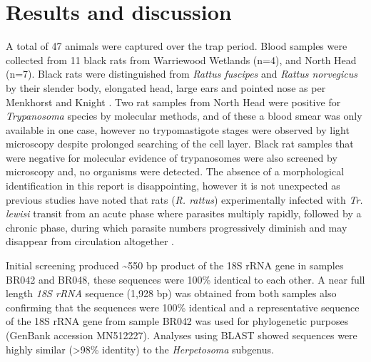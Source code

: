 \documentclass[a4paper, nobind]{templates/ociamthesis}
\begin{document}
\hypertarget{results-and-discussion-1}{%
\section{Results and discussion}\label{results-and-discussion-1}}

A total of 47 animals were captured over the trap period. Blood samples were collected from 11 black rats from Warriewood Wetlands (n=4), and North Head (n=7). Black rats were distinguished from \emph{Rattus fuscipes} and \emph{Rattus norvegicus} by their slender body, elongated head, large ears and pointed nose as per Menkhorst and Knight \autocite*{menkhorstFieldGuideMammals2011}. Two rat samples from North Head were positive for \emph{Trypanosoma} species by molecular methods, and of these a blood smear was only available in one case, however no trypomastigote stages were observed by light microscopy despite prolonged searching of the cell layer. Black rat samples that were negative for molecular evidence of trypanosomes were also screened by microscopy and, no organisms were detected. The absence of a morphological identification in this report is disappointing, however it is not unexpected as previous studies have noted that rats (\emph{R. rattus}) experimentally infected with \emph{Tr. lewisi} transit from an acute phase where parasites multiply rapidly, followed by a chronic phase, during which parasite numbers progressively diminish and may disappear from circulation altogether \autocite{mackerrasHaematozoaAustralianMammals1959}.

Initial screening produced \textasciitilde550 bp product of the 18S rRNA gene in samples BR042 and BR048, these sequences were 100\% identical to each other. A near full length \emph{18S rRNA} sequence (1,928 bp) was obtained from both samples also confirming that the sequences were 100\% identical and a representative sequence of the 18S rRNA gene from sample BR042 was used for phylogenetic purposes (GenBank accession MN512227). Analyses using BLAST showed sequences were highly similar (\textgreater98\% identity) to the \emph{Herpetosoma} subgenus.
\end{document}
